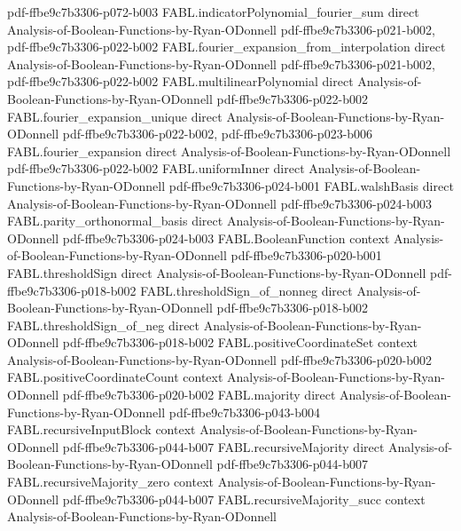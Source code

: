 \begin{theorem}
  {pdf-ffbe9c7b3306-p072-b003}
\proofstep
  {FABL.indicatorPolynomial_fourier_sum}
  {direct}
  {Analysis-of-Boolean-Functions-by-Ryan-ODonnell}
  {pdf-ffbe9c7b3306-p021-b002,
    pdf-ffbe9c7b3306-p022-b002}
\proofstep
  {FABL.fourier_expansion_from_interpolation}
  {direct}
  {Analysis-of-Boolean-Functions-by-Ryan-ODonnell}
  {pdf-ffbe9c7b3306-p021-b002,
    pdf-ffbe9c7b3306-p022-b002}
\proofstep
  {FABL.multilinearPolynomial}
  {direct}
  {Analysis-of-Boolean-Functions-by-Ryan-ODonnell}
  {pdf-ffbe9c7b3306-p022-b002}
\proofstep
  {FABL.fourier_expansion_unique}
  {direct}
  {Analysis-of-Boolean-Functions-by-Ryan-ODonnell}
  {pdf-ffbe9c7b3306-p022-b002,
    pdf-ffbe9c7b3306-p023-b006}
\proofstep
  {FABL.fourier_expansion}
  {direct}
  {Analysis-of-Boolean-Functions-by-Ryan-ODonnell}
  {pdf-ffbe9c7b3306-p022-b002}
\proofstep
  {FABL.uniformInner}
  {direct}
  {Analysis-of-Boolean-Functions-by-Ryan-ODonnell}
  {pdf-ffbe9c7b3306-p024-b001}
\proofstep
  {FABL.walshBasis}
  {direct}
  {Analysis-of-Boolean-Functions-by-Ryan-ODonnell}
  {pdf-ffbe9c7b3306-p024-b003}
\proofstep
  {FABL.parity_orthonormal_basis}
  {direct}
  {Analysis-of-Boolean-Functions-by-Ryan-ODonnell}
  {pdf-ffbe9c7b3306-p024-b003}
\proofstep
  {FABL.BooleanFunction}
  {context}
  {Analysis-of-Boolean-Functions-by-Ryan-ODonnell}
  {pdf-ffbe9c7b3306-p020-b001}
\proofstep
  {FABL.thresholdSign}
  {direct}
  {Analysis-of-Boolean-Functions-by-Ryan-ODonnell}
  {pdf-ffbe9c7b3306-p018-b002}
\proofstep
  {FABL.thresholdSign_of_nonneg}
  {direct}
  {Analysis-of-Boolean-Functions-by-Ryan-ODonnell}
  {pdf-ffbe9c7b3306-p018-b002}
\proofstep
  {FABL.thresholdSign_of_neg}
  {direct}
  {Analysis-of-Boolean-Functions-by-Ryan-ODonnell}
  {pdf-ffbe9c7b3306-p018-b002}
\proofstep
  {FABL.positiveCoordinateSet}
  {context}
  {Analysis-of-Boolean-Functions-by-Ryan-ODonnell}
  {pdf-ffbe9c7b3306-p020-b002}
\proofstep
  {FABL.positiveCoordinateCount}
  {context}
  {Analysis-of-Boolean-Functions-by-Ryan-ODonnell}
  {pdf-ffbe9c7b3306-p020-b002}
\proofstep
  {FABL.majority}
  {direct}
  {Analysis-of-Boolean-Functions-by-Ryan-ODonnell}
  {pdf-ffbe9c7b3306-p043-b004}
\proofstep
  {FABL.recursiveInputBlock}
  {context}
  {Analysis-of-Boolean-Functions-by-Ryan-ODonnell}
  {pdf-ffbe9c7b3306-p044-b007}
\proofstep
  {FABL.recursiveMajority}
  {direct}
  {Analysis-of-Boolean-Functions-by-Ryan-ODonnell}
  {pdf-ffbe9c7b3306-p044-b007}
\proofstep
  {FABL.recursiveMajority_zero}
  {context}
  {Analysis-of-Boolean-Functions-by-Ryan-ODonnell}
  {pdf-ffbe9c7b3306-p044-b007}
\proofstep
  {FABL.recursiveMajority_succ}
  {context}
  {Analysis-of-Boolean-Functions-by-Ryan-ODonnell}

\end{theorem}
